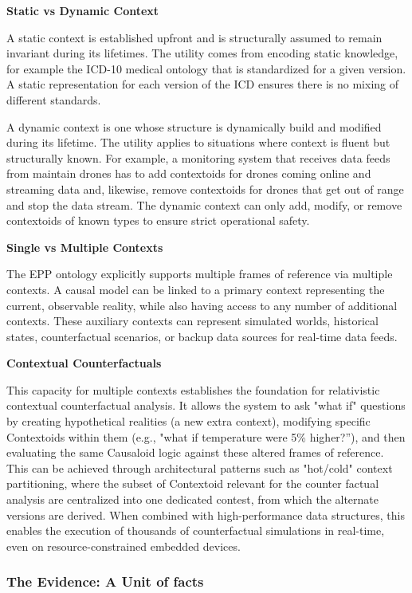 \textbf{Static vs Dynamic Context}

A static context is established upfront and is structurally assumed to remain invariant during its lifetimes. The utility comes from encoding static knowledge, for example the ICD-10 medical ontology that is standardized for a given version. A static representation for each version of the ICD ensures there is no mixing of different standards. 

A dynamic context is one whose structure is dynamically build and modified during its lifetime. The utility applies to situations where context is fluent but structurally known. For example, a monitoring system that receives data feeds from maintain drones has to add contextoids for drones coming online and streaming data and, likewise, remove contextoids for drones that get out of range and stop the data stream. The dynamic context can only add, modify, or remove contextoids of known types to ensure strict operational safety. 

\newpage

\textbf{Single vs Multiple Contexts}


The EPP ontology explicitly supports  multiple frames of reference via multiple contexts. A causal model can be linked to a primary context  representing the current, observable reality, while also having access to any number of additional contexts. These auxiliary contexts can represent simulated worlds, historical states, counterfactual scenarios, or backup data sources for real-time data feeds.

\textbf{Contextual Counterfactuals}

This capacity for multiple contexts establishes the foundation for relativistic contextual counterfactual analysis. It allows the system to ask "what if" questions by creating hypothetical realities (a new extra context), modifying specific Contextoids within them (e.g., "what if temperature were 5\% higher?”), and then evaluating the same Causaloid logic against these altered frames of reference. This can be achieved through architectural patterns such as  "hot/cold" context partitioning, where the subset of Contextoid relevant for the counter factual analysis are centralized into one dedicated contest, from which the alternate versions are derived. When combined with high-performance data structures, this  enables the execution of thousands of counterfactual simulations in real-time, even on resource-constrained embedded devices.

\subsubsection{The Evidence: A Unit of facts}
\label{sec:ontology_evidence}


